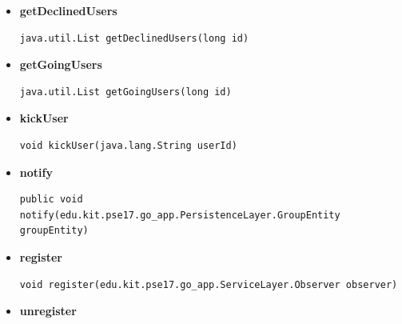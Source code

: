\documentclass[11pt,a4paper]{report}
\begin{document}
{{{{{{{{{{{{{{{\begin{itemize}
{\begin{lstlisting}[frame=none]
public edu.kit.pse17.go_app.PersistenceLayer.GoEntity getById(java.lang.Long id)\end{lstlisting} %
}%
\item{ 
\hypertarget{edu.kit.pse17.go_app.PersistenceLayer.daos.GroupDaoImp.getDeclinedUsers(long)}{{\bf  getDeclinedUsers}\\}
\begin{lstlisting}[frame=none]
java.util.List getDeclinedUsers(long id)\end{lstlisting} %
}%
\item{ 
\hypertarget{edu.kit.pse17.go_app.PersistenceLayer.daos.GroupDaoImp.getGoingUsers(long)}{{\bf  getGoingUsers}\\}
\begin{lstlisting}[frame=none]
java.util.List getGoingUsers(long id)\end{lstlisting} %
}%
\item{ 
\hypertarget{edu.kit.pse17.go_app.PersistenceLayer.daos.GroupDaoImp.kickUser(java.lang.String)}{{\bf  kickUser}\\}
\begin{lstlisting}[frame=none]
void kickUser(java.lang.String userId)\end{lstlisting} %
}%
\item{ 
\hypertarget{edu.kit.pse17.go_app.PersistenceLayer.daos.GroupDaoImp.notify(edu.kit.pse17.go_app.PersistenceLayer.GroupEntity)}{{\bf  notify}\\}
\begin{lstlisting}[frame=none]
public void notify(edu.kit.pse17.go_app.PersistenceLayer.GroupEntity groupEntity)\end{lstlisting} %
}%
\item{ 
\hypertarget{edu.kit.pse17.go_app.PersistenceLayer.daos.GroupDaoImp.register(edu.kit.pse17.go_app.ServiceLayer.Observer)}{{\bf  register}\\}
\begin{lstlisting}[frame=none]
void register(edu.kit.pse17.go_app.ServiceLayer.Observer observer)\end{lstlisting} %
}%
\item{ 
\hypertarget{edu.kit.pse17.go_app.PersistenceLayer.daos.GroupDaoImp.unregister(edu.kit.pse17.go_app.ServiceLayer.Observer)}{{\bf  unregister}\\}
}
\end{itemize}}}}}}}}}}}}}}}}
\end{document}
